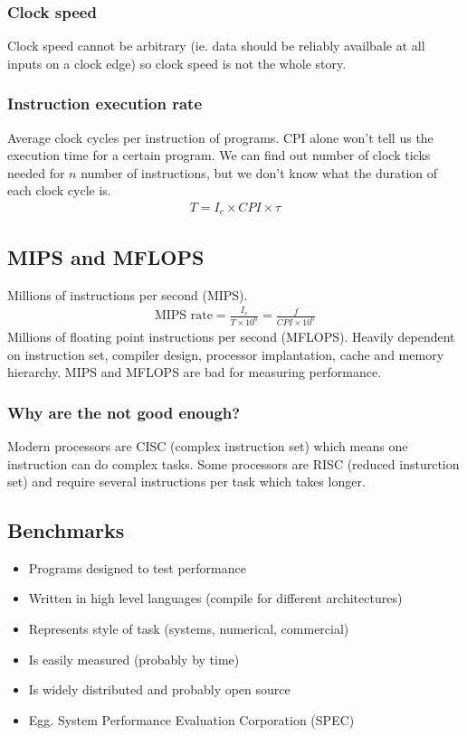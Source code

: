 \subsubsection{Clock speed}\label{ssub:clock_speed}

Clock speed cannot be arbitrary (ie. data should be reliably availbale at all inputs on a clock edge) so clock speed is not the whole story.

\subsubsection{Instruction execution rate}\label{ssub:instruction_execution_rate}

Average clock cycles per instruction of programs.
CPI alone won't tell us the execution time for a certain program.
We can find out number of clock ticks needed for \(n\) number of instructions, but we don't know what the duration of each clock cycle is.
\begin{align*}
	T = I_c \times CPI \times \tau
\end{align*}

\subsection{MIPS and MFLOPS}\label{sub:mips_and_mflops}

Millions of instructions per second (MIPS).
\begin{align*}
	\textrm{MIPS rate} = \frac{I_c}{T \times 10^6} = \frac{f}{CPI \times 10^6}
\end{align*}
Millions of floating point instructions per second (MFLOPS).
Heavily dependent on instruction set, compiler design, processor implantation, cache and memory hierarchy.
MIPS and MFLOPS are bad for measuring performance.

\subsubsection{Why are the not good enough?}\label{ssub:why_are_the_not_good_enough_}

Modern processors are CISC (complex instruction set) which means one instruction can do complex tasks.
Some processors are RISC (reduced insturction set) and require several instructions per task which takes longer.

\subsection{Benchmarks}\label{sub:benchmarks}

\begin{itemize}
	\item Programs designed to test performance
	\item Written in high level languages (compile for different architectures)
	\item Represents style of task (systems, numerical, commercial)
	\item Is easily measured (probably by time)
	\item Is widely distributed and probably open source
	\item Egg. System Performance Evaluation Corporation (SPEC)
\end{itemize}
